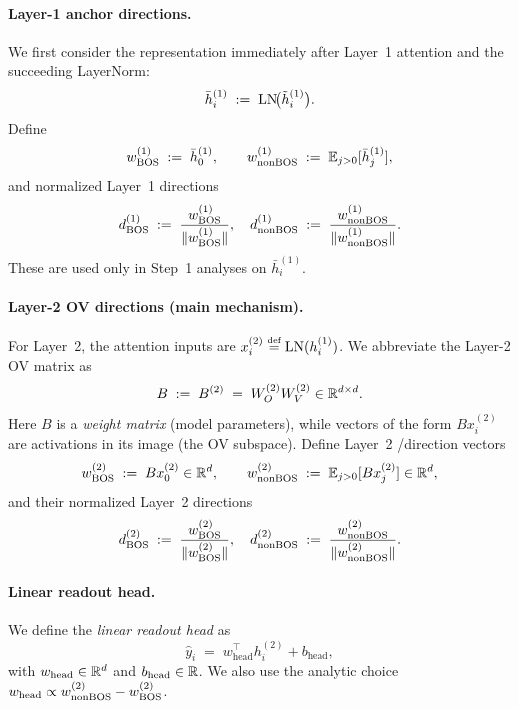\documentclass{article}
\theoremstyle{plain}
\theoremstyle{definition}
\theoremstyle{remark}
\begin{document}
\paragraph{Layer-1 anchor directions.}
We first consider the representation immediately after Layer~1 attention and the succeeding LayerNorm:
\begin{equation}
\label{eq:step1_ln_h}
\bar h_i^{(1)} \;:=\; \mathrm{LN}\!\big(\tilde h_i^{(1)}\big).
\end{equation}
Define
\begin{equation}
w_{\text{BOS}}^{(1)} \;:=\; \bar h_0^{(1)},
\qquad
w_{\text{nonBOS}}^{(1)} \;:=\; \mathbb{E}_{j>0}[\bar h_j^{(1)}],
\end{equation}
and normalized Layer~1 directions
\begin{equation}
\label{eq:d_bos_and_nonbos_ln1}
d_{\text{BOS}}^{(1)} \;:=\; \frac{w_{\text{BOS}}^{(1)}}{\|w_{\text{BOS}}^{(1)}\|}, \quad
d_{\text{nonBOS}}^{(1)} \;:=\; \frac{w_{\text{nonBOS}}^{(1)}}{\|w_{\text{nonBOS}}^{(1)}\|}.
\end{equation}
These are used only in Step~1 analyses on $\bar h_i^{(1)}$.

\paragraph{Layer-2 OV directions (main mechanism).}
For Layer~2, the attention inputs are $x_i^{(2)} \defeq \LN(h_i^{(1)})$.
We abbreviate the Layer-2 OV matrix as
\begin{equation}
B \;:=\; B^{(2)} \;=\; W_O^{(2)}W_V^{(2)} \in \mathbb{R}^{d\times d}.
\end{equation}
Here $B$ is a \emph{weight matrix} (model parameters), while vectors of the form
$Bx_i^{(2)}$ are activations in its image (the OV subspace).
Define Layer~2 \bos/\nbos direction vectors
\begin{equation}
w_{\text{BOS}}^{(2)} \;:=\; Bx_0^{(2)} \in \mathbb{R}^d,
\qquad
w_{\text{nonBOS}}^{(2)} \;:=\; \mathbb{E}_{j>0}[Bx_j^{(2)}] \in \mathbb{R}^d,
\end{equation}
and their normalized Layer~2 directions
\begin{equation}
\label{eq:d_bos_and_nonbos_l2}
d_{\text{BOS}}^{(2)} \;:=\; \frac{w_{\text{BOS}}^{(2)}}{\|w_{\text{BOS}}^{(2)}\|},
\quad
d_{\text{nonBOS}}^{(2)} \;:=\; \frac{w_{\text{nonBOS}}^{(2)}}{\|w_{\text{nonBOS}}^{(2)}\|}.
\end{equation}

\paragraph{Linear readout head.}
We define the \emph{linear readout head} as
\begin{equation}
\hat y_i \;=\; w_{\text{head}}^\top h_i^{(2)} + b_{\text{head}},
\end{equation}
with $w_{\text{head}}\in\mathbb{R}^d$ and $b_{\text{head}}\in\mathbb{R}$.
We also use the analytic choice $w_{\text{head}}\propto w_{\text{nonBOS}}^{(2)}-w_{\text{BOS}}^{(2)}$.
\end{document}
